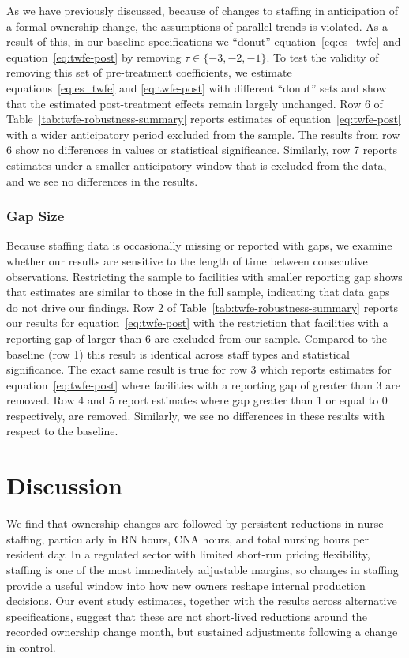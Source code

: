 \documentclass[12pt]{article}
\begin{document}
As we have previously discussed, because of changes to staffing in anticipation of a formal ownership change, the assumptions of parallel trends is violated. As a result of this, in our baseline specifications we ``donut'' equation~\ref{eq:es_twfe} and equation~\ref{eq:twfe-post} by removing $\tau\in\{-3,-2,-1\}$. To test the validity of removing this set of pre-treatment coefficients, we estimate equations~\ref{eq:es_twfe} and \ref{eq:twfe-post} with different ``donut'' sets and show that the estimated post-treatment effects remain largely unchanged. Row 6 of Table~\ref{tab:twfe-robustness-summary} reports estimates of equation~\ref{eq:twfe-post} with a wider anticipatory period excluded from the sample. The results from row 6 show no differences in values or statistical significance. Similarly, row 7 reports estimates under a smaller anticipatory window that is excluded from the data, and we see no differences in the results.

\subsubsection{Gap Size}

Because staffing data is occasionally missing or reported with gaps, we examine whether our results are sensitive to the length of time between consecutive observations. Restricting the sample to facilities with smaller reporting gap shows that estimates are similar to those in the full sample, indicating that data gaps do not drive our findings. Row 2 of Table~\ref{tab:twfe-robustness-summary} reports our results for equation~\ref{eq:twfe-post} with the restriction that facilities with a reporting gap of larger than 6 are excluded from our sample. Compared to the baseline (row 1) this result is identical across staff types and statistical significance. The exact same result is true for row 3 which reports estimates for equation~\ref{eq:twfe-post} where facilities with a reporting gap of greater than 3 are removed. Row 4 and 5 report estimates where gap greater than 1 or equal to 0 respectively, are removed. Similarly, we see no differences in these results with respect to the baseline.

\section{Discussion}\label{sec:discussion}

We find that ownership changes are followed by persistent reductions in nurse staffing, particularly in RN hours, CNA hours, and total nursing hours per resident day. In a regulated sector with limited short-run pricing flexibility, staffing is one of the most immediately adjustable margins, so changes in staffing provide a useful window into how new owners reshape internal production decisions. Our event study estimates, together with the results across alternative specifications, suggest that these are not short-lived reductions around the recorded ownership change month, but sustained adjustments following a change in control.
\end{document}
